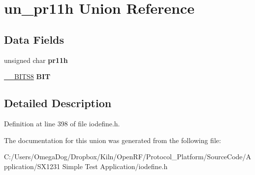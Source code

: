 \hypertarget{unionun__pr11h}{\section{un\-\_\-pr11h Union Reference}
\label{unionun__pr11h}
}
\subsection*{Data Fields}
\begin{DoxyCompactItemize}
\item 
\hypertarget{unionun__pr11h_a1f5891795a5e1a863b97ea95b170cc25}{unsigned char {\bfseries pr11h}}\label{unionun__pr11h_a1f5891795a5e1a863b97ea95b170cc25}

\item 
\hypertarget{unionun__pr11h_a0f82d754202f88520ff518e7f3cf8220}{\hyperlink{struct_____b_i_t_s8}{\-\_\-\-\_\-\-B\-I\-T\-S8} {\bfseries B\-I\-T}}\label{unionun__pr11h_a0f82d754202f88520ff518e7f3cf8220}

\end{DoxyCompactItemize}


\subsection{Detailed Description}


Definition at line 398 of file iodefine.\-h.



The documentation for this union was generated from the following file\-:\begin{DoxyCompactItemize}
\item 
C\-:/\-Users/\-Omega\-Dog/\-Dropbox/\-Kiln/\-Open\-R\-F/\-Protocol\-\_\-\-Platform/\-Source\-Code/\-Application/\-S\-X1231 Simple Test Application/iodefine.\-h\end{DoxyCompactItemize}

